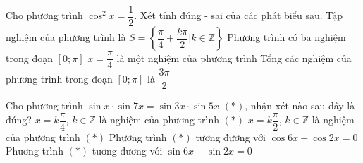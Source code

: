 \begin{ex}%
 Cho phương  trình $\cos ^2 x=\dfrac{1}{2}$. Xét tính đúng - sai của các phát biểu sau.
  \choiceTF
  {\True Tập nghiệm của phương trình là $S=\left\{\dfrac{\pi}{4}+\dfrac{k \pi}{2}\bigg|  k \in \mathbb{Z}\right\}$}
  {Phương trình có ba nghiệm trong đoạn $[0; \pi]$} 
  {\True $x=\dfrac{\pi}{4}$ là một nghiệm của phương trình} 
  {Tổng các nghiệm của phương trình  trong đoạn $[0; \pi]$ là $\dfrac{3 \pi}{2}$}
\end{ex}

\begin{ex}%
 Cho phương trình $\sin  x\cdot\sin 7x=\sin 3x\cdot\sin 5x$ $(*)$, nhận xét nào sau đây là đúng?
 \choiceTF 
  {\True $x=k\dfrac{\pi}{4}$, $k\in\mathbb{Z}$ là nghiệm của phương  trình $(*)$}
  {\True  $x=k\dfrac{\pi}{2}$, $k\in\mathbb{Z}$ là nghiệm của phương trình $(*)$}
  {\True  Phương trình $(*)$ tương đương với $\cos6x-\cos2x=0$}
  {Phương trình $(*)$ tương đương với  $\sin6x-\sin2x=0$}
\end{ex}

